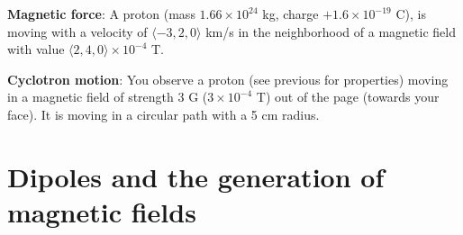\documentclass{handout}
\begin{document}
\begin{questions}
    \question \textbf{Magnetic force}: A proton (mass $1.66\times 10^{24}$ kg, charge $+1.6\times 10^{-19}$ C), is moving with a velocity of $\langle-3,2,0\rangle$ km/s in the neighborhood of a magnetic field with value $\langle 2,4,0\rangle\times 10^{-4} $ T.

    \question \textbf{Cyclotron motion}: You observe a proton (see previous for properties) moving in a magnetic field of strength 3 G ($3\times 10^{-4}$ T) out of the page (towards your face). It is moving in a circular path with a 5 cm radius.
\end{questions}

\section{Dipoles and the generation of magnetic fields}

\end{document}
